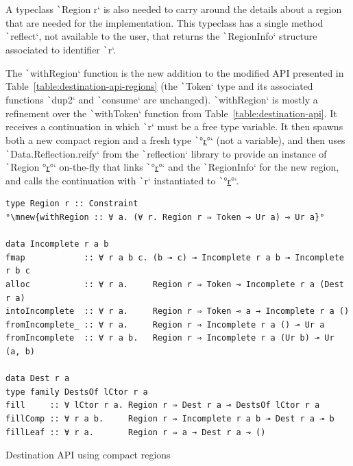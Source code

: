 \documentclass[english]{jflart}
\newcommand{\mnew}[1]{\colorbox{green!50}{#1}}
\newcommand{\muline}[1]{\uline{#1}}
\begin{document}
A typeclass \texttt`Region r` is also needed to carry around the details about a region that are needed for the implementation. This typeclass has a single method \texttt`reflect`, not available to the user, that returns the \texttt`RegionInfo` structure associated to identifier \texttt`r`.

The \texttt`withRegion` function is the new addition to the modified API presented in Table~\ref{table:destination-api-regions} (the \texttt`Token` type and its associated functions \texttt`dup2` and \texttt`consume` are unchanged). \texttt`withRegion` is mostly a refinement over the \texttt`withToken` function from Table~\ref{table:destination-api}. It receives a continuation in which \texttt`r` must be a free type variable. It then spawns both a new compact region and a fresh type \texttt`°\muline{r}°` (not a variable), and then uses \texttt`Data.Reflection.reify` from the \texttt`reflection` library to provide an instance of \texttt`Region °\muline{r}°` on-the-fly that links \texttt`°\muline{r}°` and the \texttt`RegionInfo` for the new region, and calls the continuation with \texttt`r` instantiated to \texttt`°\muline{r}°`.

\begin{table}[t]
\small
\begin{verbatim}
type Region r :: Constraint
°\mnew{withRegion :: ∀ a. (∀ r. Region r ⇒ Token ⊸ Ur a) ⊸ Ur a}°

data Incomplete r a b
fmap            :: ∀ r a b c. (b ⊸ c) ⊸ Incomplete r a b ⊸ Incomplete r b c
alloc           :: ∀ r a.     Region r ⇒ Token ⊸ Incomplete r a (Dest r a)
intoIncomplete  :: ∀ r a.     Region r ⇒ Token ⊸ a → Incomplete r a ()
fromIncomplete_ :: ∀ r a.     Region r ⇒ Incomplete r a () ⊸ Ur a
fromIncomplete  :: ∀ r a b.   Region r ⇒ Incomplete r a (Ur b) ⊸ Ur (a, b)

data Dest r a
type family DestsOf lCtor r a
fill     :: ∀ lCtor r a. Region r ⇒ Dest r a ⊸ DestsOf lCtor r a
fillComp :: ∀ r a b.     Region r ⇒ Incomplete r a b ⊸ Dest r a ⊸ b
fillLeaf :: ∀ r a.       Region r ⇒ a → Dest r a ⊸ ()
\end{verbatim}
\caption{Destination API using compact regions}
\label{table:destination-api-regions}
\end{table}
\end{document}
